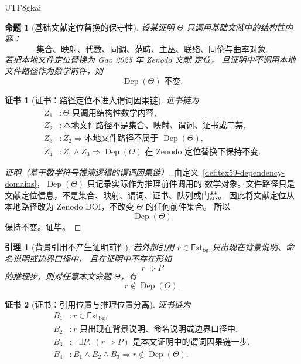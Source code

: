 \documentclass[12pt]{article}
\newtheorem{proposition}{命题}[section]
\newtheorem{lemma}{引理}[section]
\newtheorem{Certificate}{证书}[section]
\DeclareMathOperator{\Dep}{Dep}
\begin{document}
\begin{CJK*}{UTF8}{gkai}
\begin{proposition}[基础文献定位替换的保守性]
\label{prop:tex59-zenodo-source-conservative}
设某证明 \(\Theta\) 只调用基础文献中的结构性内容：
\[
  \text{集合、映射、代数、同调、范畴、主丛、联络、同伦与曲率对象}.
\]
若把本地文件定位替换为 Gao 2025 年 Zenodo 文献 \cite{Gao2025PureMathZenodo} 定位，
且证明中不调用本地文件路径作为数学前件，则
\[
  \Dep(\Theta)
  \text{ 不变}.
\]
\end{proposition}

\begin{Certificate}[证书：路径定位不进入谓词因果链]
\label{cert:tex59-zenodo-source-conservative}
证书链为
\[
\begin{aligned}
  Z_1 &: \Theta\text{ 只调用结构性数学内容},\\
  Z_2 &: \text{本地文件路径不是集合、映射、谓词、证书或门禁},\\
  Z_3 &: Z_2\Rightarrow \text{本地文件路径不属于 }\Dep(\Theta),\\
  Z_4 &: Z_1\wedge Z_3
         \Rightarrow
         \Dep(\Theta)\text{ 在 Zenodo 定位替换下保持不变}.
\end{aligned}
\]
\end{Certificate}

\begin{proof}[证明（基于数学符号推演逻辑的谓词因果链）]
由定义~\ref{def:tex59-dependency-domains}，\(\Dep(\Theta)\) 只记录实际作为推理前件调用的
数学对象。文件路径只是文献定位信息，不是集合、映射、谓词、证书、队列或门禁。
因此将文献定位从本地路径改为 Zenodo DOI，不改变 \(\Theta\) 的任何前件集合。
所以
\[
  \Dep(\Theta)
\]
保持不变。证毕。
\end{proof}

\begin{lemma}[背景引用不产生证明前件]
\label{lem:tex59-background-nondependence}
若外部引用 \(r\in\mathsf{Ext}_{\mathrm{bg}}\) 只出现在背景说明、命名说明或边界口径中，
且在证明中不存在形如
\[
  r\Rightarrow P
\]
的推理步，则对任意本文命题 \(\Theta\)，有
\[
  r\notin\Dep(\Theta).
\]
\end{lemma}

\begin{Certificate}[证书：引用位置与推理位置分离]
\label{cert:tex59-background-nondependence}
证书链为
\[
\begin{aligned}
  B_1 &: r\in\mathsf{Ext}_{\mathrm{bg}},\\
  B_2 &: r\text{ 只出现在背景说明、命名说明或边界口径中},\\
  B_3 &: \neg\exists P,\ (r\Rightarrow P)\text{ 是本文证明中的谓词因果链一步},\\
  B_4 &: B_1\wedge B_2\wedge B_3\Rightarrow r\notin\Dep(\Theta).
\end{aligned}
\]
\end{Certificate}


\end{CJK*}
\end{document}
